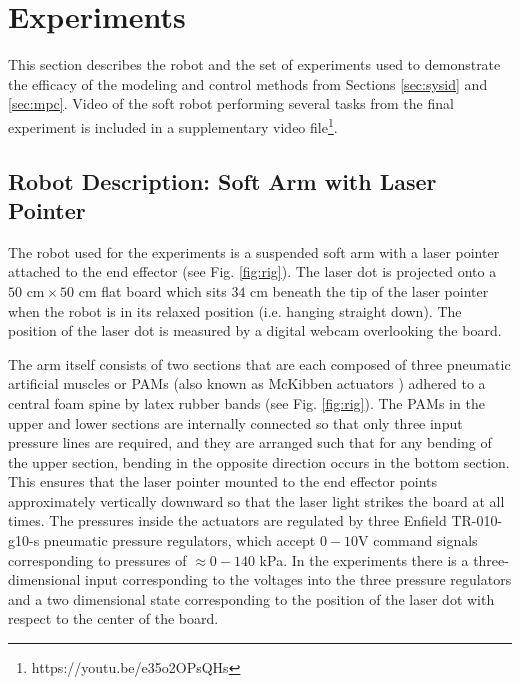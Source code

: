 \section{Experiments}
\label{sec:experiments}

This section describes the robot and the set of experiments used to demonstrate the efficacy of the modeling and control methods from Sections \ref{sec:sysid} and \ref{sec:mpc}.
Video of the soft robot performing several tasks from the final experiment is included in a supplementary video file\footnote{https://youtu.be/e35o2OPsQHs}.

\subsection{Robot Description: Soft Arm with Laser Pointer}
\label{sec:robot}

The robot used for the experiments is a suspended soft arm with a laser pointer attached to the end effector (see Fig. \ref{fig:rig}). 
The laser dot is projected onto a ${50\text{ cm} \times 50\text{ cm}}$ flat board which sits $34\text{ cm}$ beneath the tip of the laser pointer when the robot is in its relaxed position (i.e. hanging straight down).
The position of the laser dot is measured by a digital webcam overlooking the board.

The arm itself consists of two sections that are each composed of three pneumatic artificial muscles or PAMs (also known as McKibben actuators \cite{tondu2012modelling}) adhered to a central foam spine by latex rubber bands (see Fig. \ref{fig:rig}).
The PAMs in the upper and lower sections are internally connected so that only three input pressure lines are required, and
they are arranged such that for any bending of the upper section, bending in the opposite direction occurs in the bottom section.
This ensures that the laser pointer mounted to the end effector points approximately vertically downward so that the laser light strikes the board at all times.
The pressures inside the actuators are regulated by three Enfield TR-010-g10-s pneumatic pressure regulators, which accept ${0-10}$V command signals corresponding to pressures of ${ \approx 0 - 140 }$ kPa.
In the experiments there is a three-dimensional input corresponding to the voltages into the three pressure regulators and a two dimensional state corresponding to the position of the laser dot with respect to the center of the board.

